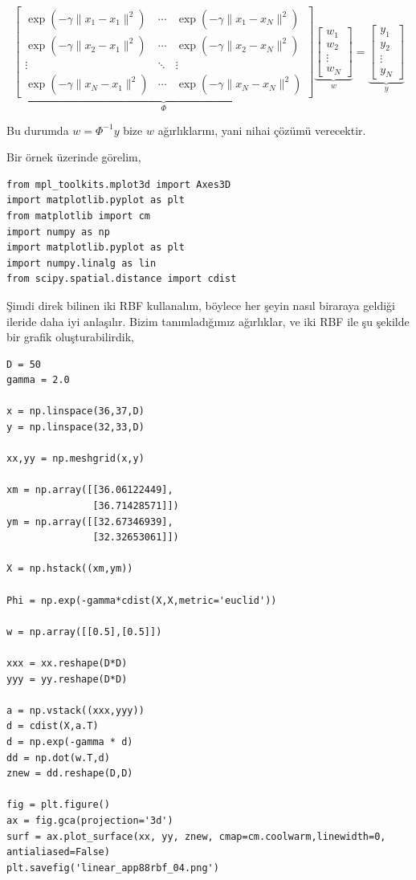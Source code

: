\documentclass[12pt,fleqn]{article}\usepackage{../../common}
\begin{document}
$$
\underbrace{
\left[\begin{array}{rrr} 
    \exp(-\gamma \|x_1-x_1\|^2) & \cdots & \exp(-\gamma \|x_1-x_N\|^2)\\ 
    \exp(-\gamma \|x_2-x_1\|^2) & \cdots & \exp(-\gamma \|x_2-x_N\|^2)\\ 
    \vdots & \ddots & \vdots \\ 
    \exp(-\gamma \|x_N-x_1\|^2) & \cdots & \exp(-\gamma \|x_N-x_N\|^2)
\end{array}\right]
}_{\Phi}
\underbrace{
\left[\begin{array}{r}
 w_1  \\ w_2  \\ \vdots \\  w_N
\end{array}\right]}_{w}
=
\underbrace{
\left[\begin{array}{rrr} y_1  \\
 y_2  \\ \vdots \\  y_N
\end{array}\right]}_{y}
$$

Bu durumda $w = \Phi^{-1}y$ bize $w$ ağırlıklarını, yani nihai çözümü
verecektir. 

Bir örnek üzerinde görelim,

\begin{verbatim}
from mpl_toolkits.mplot3d import Axes3D
import matplotlib.pyplot as plt
from matplotlib import cm
import numpy as np
import matplotlib.pyplot as plt
import numpy.linalg as lin
from scipy.spatial.distance import cdist
\end{verbatim}

Şimdi direk bilinen iki RBF kullanalım, böylece her şeyin nasıl biraraya
geldiği ileride daha iyi anlaşılır. Bizim tanımladığımız ağırlıklar, ve iki
RBF ile şu şekilde bir grafik oluşturabilirdik,

\begin{verbatim}
D = 50
gamma = 2.0

x = np.linspace(36,37,D)
y = np.linspace(32,33,D)

xx,yy = np.meshgrid(x,y)

xm = np.array([[36.06122449],
               [36.71428571]])
ym = np.array([[32.67346939],
               [32.32653061]])
	       
X = np.hstack((xm,ym))

Phi = np.exp(-gamma*cdist(X,X,metric='euclid'))

w = np.array([[0.5],[0.5]])

xxx = xx.reshape(D*D)
yyy = yy.reshape(D*D)

a = np.vstack((xxx,yyy))
d = cdist(X,a.T)
d = np.exp(-gamma * d)
dd = np.dot(w.T,d)
znew = dd.reshape(D,D)

fig = plt.figure()
ax = fig.gca(projection='3d')
surf = ax.plot_surface(xx, yy, znew, cmap=cm.coolwarm,linewidth=0, antialiased=False)
plt.savefig('linear_app88rbf_04.png')
\end{verbatim}
\end{document}
